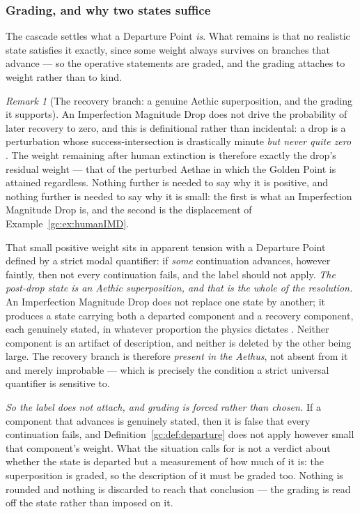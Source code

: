 \documentclass[11pt]{article}
\numberwithin{equation}{section}
\theoremstyle{plain}
\theoremstyle{definition}
\theoremstyle{remark}
\newtheorem{remark}[theorem]{Remark}
\begin{document}
\subsubsection{Grading, and why two states suffice}
\label{gc:subsub:grading}

The cascade settles what a Departure Point \emph{is}. What remains is
that no realistic state satisfies it exactly, since some weight always
survives on branches that advance --- so the operative statements are
graded, and the grading attaches to weight rather than to kind.

\begin{remark}[The recovery branch: a genuine Aethic superposition,
and the grading it supports]\label{gc:rem:boltzmann}
An Imperfection Magnitude Drop does not drive the probability of later
recovery to zero, and this is definitional rather than incidental: a
drop is a perturbation whose success-intersection is drastically minute
\emph{but never quite zero} \cite{Nexus}. The weight remaining after
human extinction is therefore exactly the drop's residual weight ---
that of the perturbed Aethae in which the Golden Point is attained
regardless. Nothing further is needed to say why it is positive, and
nothing further is needed to say why it is small: the first is what an
Imperfection Magnitude Drop is, and the second is the displacement of
Example~\ref{gc:ex:humanIMD}.

That small positive weight sits in apparent tension with a Departure
Point defined by a strict modal quantifier: if \emph{some} continuation
advances, however faintly, then not every continuation fails, and the
label should not apply. \emph{The post-drop state is an Aethic superposition, and that is the
whole of the resolution.} An Imperfection Magnitude Drop does not
replace one state by another; it produces a state carrying both a
departed component and a recovery component, each genuinely stated, in
whatever proportion the physics dictates \cite{WeightAlg}. Neither
component is an artifact of description, and neither is deleted by the
other being large. The recovery branch is therefore \emph{present in
the Aethus}, not absent from it and merely improbable --- which is
precisely the condition a strict universal quantifier is sensitive to.

\emph{So the label does not attach, and grading is forced rather than
chosen.} If a component that advances is genuinely stated, then it is
false that every continuation fails, and
Definition~\ref{gc:def:departure} does not apply however small that
component's weight. What the situation calls for is not a verdict about
whether the state is departed but a measurement of how much of it is:
the superposition is graded, so the description of it must be graded
too. Nothing is rounded and nothing is discarded to reach that
conclusion --- the grading is read off the state rather than imposed on
it.


\end{remark}
\end{document}
